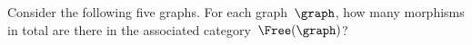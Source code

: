 \begin{gradedexercise}
    \label{ex:HowManyMorphisms}
    Consider the following five graphs.
    For each graph~$\graph$, how many morphisms in total are there in the associated category~$\Free(\graph)$?
    \begin{center}
    \end{center}
\end{gradedexercise}

